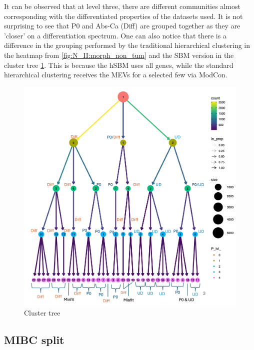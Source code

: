 It can be observed that at level three, there are different communities almost corresponding with the differentiated properties of the datasets used. It is not surprising to see that P0 and Abs-Ca (Diff) are grouped together as they are 'closer' on a differentiation spectrum. One can also notice that there is a difference in the grouping performed by the traditional hierarchical clustering in the heatmap from \cref{fig:N_II:morph_non_tum} and the SBM version in the cluster tree \cref{fig:N_II:cluster_tree}. This is because the hSBM uses all genes, while the standard hierarchical clustering receives the MEVs for a selected few via ModCon.



\begin{figure}[H]    
    \centering
    \includegraphics[width=1.0\textwidth,height=1.0\textheight,keepaspectratio]{Sections/Network_II/resources/non_tum/clustertree_labels.png}
    \caption{Cluster tree }
    \label{fig:N_II:cluster_tree}
\end{figure}



% 
\subsection{MIBC split} \label{s:N_II:tum_split}

